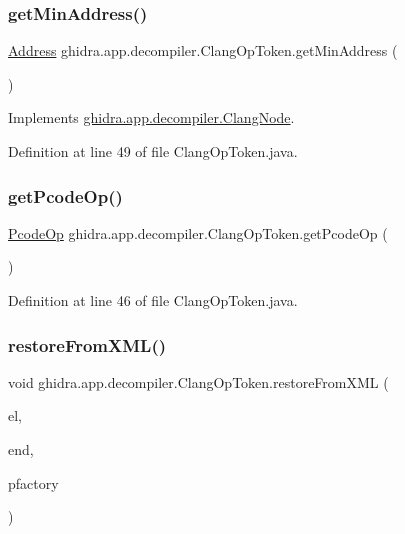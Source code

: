 \subsubsection{\texorpdfstring{getMinAddress()}{getMinAddress()}}
{\footnotesize\ttfamily \mbox{\hyperlink{class_address}{Address}} ghidra.\+app.\+decompiler.\+Clang\+Op\+Token.\+get\+Min\+Address (\begin{DoxyParamCaption}{ }\end{DoxyParamCaption})\hspace{0.3cm}{\ttfamily [inline]}}



Implements \mbox{\hyperlink{interfaceghidra_1_1app_1_1decompiler_1_1_clang_node_a28f86ac40636cd77392e26367db69dc3}{ghidra.\+app.\+decompiler.\+Clang\+Node}}.



Definition at line 49 of file Clang\+Op\+Token.\+java.

\mbox{\label{classghidra_1_1app_1_1decompiler_1_1_clang_op_token_a2467a7ba806e376b9a8c041e9d16cf41}} 
\subsubsection{\texorpdfstring{getPcodeOp()}{getPcodeOp()}}
{\footnotesize\ttfamily \mbox{\hyperlink{class_pcode_op}{Pcode\+Op}} ghidra.\+app.\+decompiler.\+Clang\+Op\+Token.\+get\+Pcode\+Op (\begin{DoxyParamCaption}{ }\end{DoxyParamCaption})\hspace{0.3cm}{\ttfamily [inline]}}



Definition at line 46 of file Clang\+Op\+Token.\+java.

\mbox{\label{classghidra_1_1app_1_1decompiler_1_1_clang_op_token_a510c9a39313930b1a7fa84d76cdeb34a}} 
\subsubsection{\texorpdfstring{restoreFromXML()}{restoreFromXML()}}
{\footnotesize\ttfamily void ghidra.\+app.\+decompiler.\+Clang\+Op\+Token.\+restore\+From\+X\+ML (\begin{DoxyParamCaption}\item[{Xml\+Element}]{el,  }\item[{Xml\+Element}]{end,  }\item[{Pcode\+Factory}]{pfactory }\end{DoxyParamCaption})\hspace{0.3cm}{\ttfamily [inline]}}



